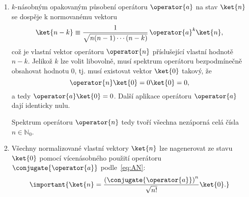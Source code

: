 \begin{solution}
\begin{enumerate}
	\item
		$k$-násobným opakovaným působení operátoru $\operator{a}$ na stav $\ket{n}$ se dospěje k normovanému vektoru
		\begin{equation}
			\ket{n-k}\equiv\frac{1}{\sqrt{n(n-1)\dotsb(n-k)}}\,\operator{a}^{k}\ket{n},
		\end{equation}
		což je vlastní vektor operátoru $\operator{n}$ příslušející vlastní hodnotě $n-k$.
        Jelikož $k$ lze volit libovolně, musí spektrum operátoru bezpodmínečně obsahovat hodnotu $0$, tj. musí existovat vektor $\ket{0}$ takový, že
		\begin{equation}
			\operator{n}\ket{0}=0\ket{0}=0,
        \end{equation}        
        a tedy $\operator{a}\ket{0}=0$.       
        Další aplikace operátoru $\operator{a}$ dají identicky nulu.

		Spektrum operátoru $\operator{n}$ tedy tvoří všechna nezáporná celá čísla $n\in\mathbb{N}_{0}$.
		
	\item
		Všechny normalizované vlastní vektory $\ket{n}$ lze nagenerovat ze stavu $\ket{0}$ pomocí vícenásobného použití operátoru $\conjugate{\operator{a}}$ podle~\eqref{eq:AN}:
		\begin{equation}
			\important{
				\ket{n}=\frac{\left(\conjugate{\operator{a}}\right)^{n}}{\sqrt{n!}}\ket{0}.			
			}
			\label{eq:EigenstateNumberOperator}
		\end{equation}		
        

\end{enumerate}
\end{solution}
